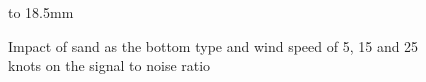 \begin{figure}[h]
\centering
{}
\newline
{}
\newline
\hbox to 18.5mm{}%
\caption{Impact of sand as the bottom type and wind speed of 5, 15 and 25 knots on the signal to noise ratio}
\end{figure}




